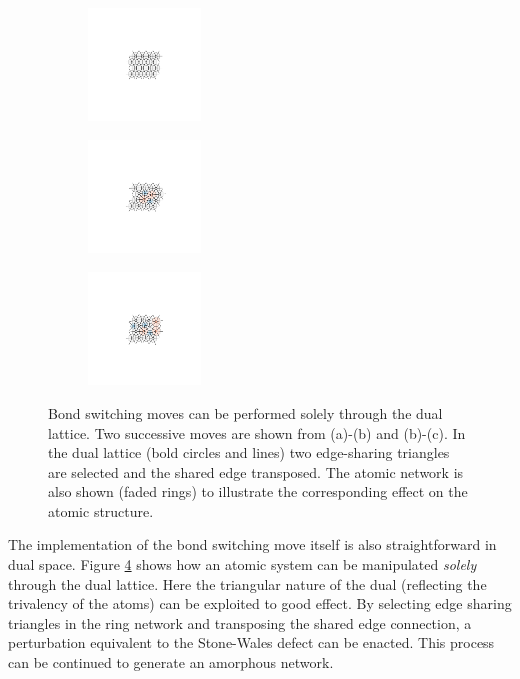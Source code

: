 \begin{figure}[bt]
     \centering
     
     \begin{subfigure}[b]{0.3\textwidth}
         \centering
         \includegraphics[height=3cm]{./figures/targeted_opt/dualswitch_0.pdf}
         \caption{}
         \label{fig:dualswitch1}
     \end{subfigure}
     \hfill
	\begin{subfigure}[b]{0.3\textwidth}
         \centering
         \includegraphics[height=3cm]{./figures/targeted_opt/dualswitch_1.pdf}
         \caption{}
         \label{fig:dualswitch2}
     \end{subfigure}
     \hfill
     \begin{subfigure}[b]{0.3\textwidth}
         \centering
         \includegraphics[height=3cm]{./figures/targeted_opt/dualswitch_2.pdf}
         \caption{}
         \label{fig:dualswitch3}
     \end{subfigure}

     \caption{Bond switching \mc{} moves can be performed solely through the dual lattice. Two successive moves are shown from (a)\--(b) and (b)\--(c). In the dual lattice (bold circles and lines) two edge\--sharing triangles are selected and the shared edge transposed. The atomic network is also shown (faded rings) to illustrate the corresponding effect on the atomic structure.}
     \label{fig:dualswitch}
\end{figure}

The implementation of the bond switching move itself is also straightforward in dual space.
Figure \ref{fig:dualswitch} shows how an atomic system can be manipulated \textit{solely} through the dual lattice.
Here the triangular nature of the dual (reflecting the trivalency of the atoms) can be exploited to good effect.
By selecting edge sharing triangles in the ring network and transposing the shared edge connection, a perturbation equivalent to the Stone\--Wales defect can be enacted. 
This process can be continued to generate an amorphous network. 

